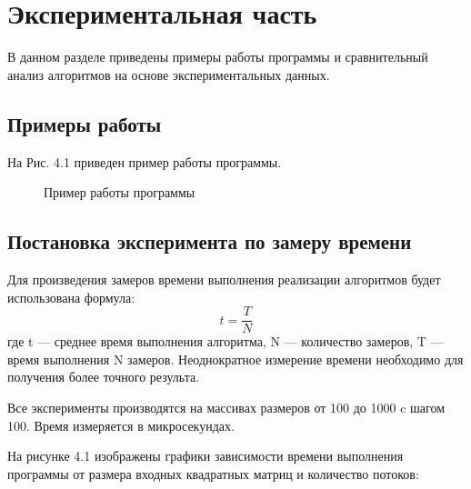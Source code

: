 \documentclass[12pt]{report}
\begin{document}
\chapter{Экспериментальная часть}

В данном разделе приведены примеры работы программы и сравнительный анализ алгоритмов на основе экспериментальных данных. 

\section{Примеры работы} 

На Рис. 4.1 приведен пример работы программы.

\begin{figure}[h]
	\caption{Пример работы программы}
	\label{figure:image}
\end{figure}

\newpage
\section{Постановка эксперимента по замеру времени}

Для произведения замеров времени выполнения реализации алгоритмов будет использована формула: \begin{equation}\label{eq:fourierrow}
	t = \frac{T}{N}
\end{equation}
где t — среднее время выполнения алгоритма, N — количество замеров, T — время выполнения N замеров.  
Неоднократное измерение времени необходимо для получения более точного результа.  
 
Все эксперименты производятся на массивах размеров от 100 до 1000 c шагом 100. Время измеряется в микросекундах.
 
 На рисунке 4.1 изображены графики зависимости времени выполнения программы от размера входных квадратных матриц и количество потоков:  
 
\end{document}
